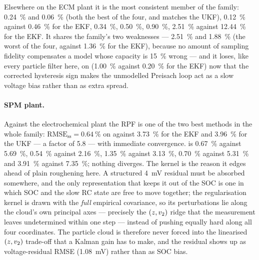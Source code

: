 Elsewhere on the ECM plant it is the most consistent member of the family: 
\SI{0.24}{\percent} and  \SI{0.06}{\percent} (both the best of the four, and 
matches the UKF),  \SI{0.12}{\percent} against \SI{0.46}{\percent} for the
EKF,  \SI{0.34}{\percent},  \SI{0.50}{\percent},
 \SI{0.90}{\percent},  \SI{2.51}{\percent} against
\SI{12.44}{\percent} for the EKF.  It shares the family's two weaknesses --- 
\SI{2.51}{\percent} and  \SI{1.88}{\percent} (the worst of the four, against
\SI{1.36}{\percent} for the EKF), because no amount of sampling fidelity compensates a model whose
capacity is \SI{15}{\percent} wrong --- and it loses, like every particle filter here, on
 (\SI{1.00}{\percent} against \SI{0.20}{\percent} for the EKF) now that the
corrected hysteresis sign makes the unmodelled Preisach loop act as a slow voltage bias rather than
as extra spread.

\paragraph{SPM plant.}  Against the electrochemical plant the RPF is one of the two best methods in
the whole family: $\mathrm{RMSE}_{\mathrm{ss}} = \SI{0.64}{\percent}$ on  against
\SI{3.73}{\percent} for the EKF and \SI{3.96}{\percent} for the UKF --- a factor of \num{5.8} ---
with immediate convergence.   is \SI{0.67}{\percent} against
\SI{5.69}{\percent},  \SI{0.54}{\percent} against \SI{2.16}{\percent},
 \SI{1.35}{\percent} against \SI{3.13}{\percent}, 
\SI{0.70}{\percent} against \SI{5.31}{\percent} and  \SI{3.91}{\percent} against
\SI{7.35}{\percent}; nothing diverges.  The kernel is the reason it edges ahead of plain roughening
here.  A structured \SI{4}{\milli\volt} residual must be absorbed somewhere, and the only
representation that keeps it out of the SOC is one in which SOC and the slow RC state are free to
move together; the regularisation kernel is drawn with the \emph{full} empirical covariance, so its
perturbations lie along the cloud's own principal axes --- precisely the $(z, v_2)$ ridge that
the measurement leaves undetermined within one step --- instead of pushing equally hard along all
four coordinates.  The particle cloud is therefore never forced into the linearised $(z,v_2)$
trade-off that a Kalman gain has to make, and the residual shows up as voltage-residual RMSE
(\SI{1.08}{\milli\volt}) rather than as SOC bias.

